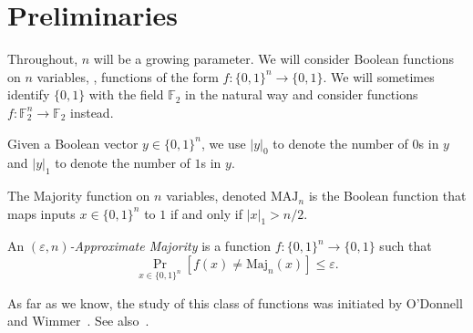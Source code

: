 \documentclass{toc}
\newcommand{\prob}[2]{\mathop{\mathrm{Pr}}_{#1}[#2]}
\newcommand{\F}{\mathbb{F}}
\newcommand{\Maj}{\mathrm{Maj}}
\begin{document}
\section{Preliminaries}

Throughout, $n$ will be a growing parameter. We will consider Boolean functions on $n$ variables, \ie, functions of the form $f:\{0,1\}^n\rightarrow \{0,1\}$. We will sometimes identify $\{0,1\}$ with the field $\F_2$ in the natural way and consider functions $f:\F_2^n \rightarrow \F_2$ instead.

%
%
%
%
%
%
%
%

Given a Boolean vector $y\in \{0,1\}^n$, we use $|y|_0$ to denote the number of $0$s in $y$ and $|y|_1$ to denote the number of $1$s in $y$.
%
%


The Majority function on $n$ variables, denoted $\mathrm{MAJ}_n$ is the
Boolean function that maps inputs $x\in \{0,1\}^n$ to $1$ if and
only if $|x|_1 > n/2$. 

\begin{definition}
\label{defn:approx-maj}
%
%
An \emph{$(\varepsilon,n)$-Approximate Majority} is a function $f:\{0,1\}^n\rightarrow \{0,1\}$ such that
\[
  \prob{x \in \{0,1\}^n}{f(x) \neq \Maj_n(x)} \leq \varepsilon.
\]
\end{definition}

As far as we know, the study of this class of functions was initiated by O'Donnell and Wimmer~\cite{odonnellwimmer}. See also~\cite{Amano-appxmaj, BlaisTan}.
\end{document}
